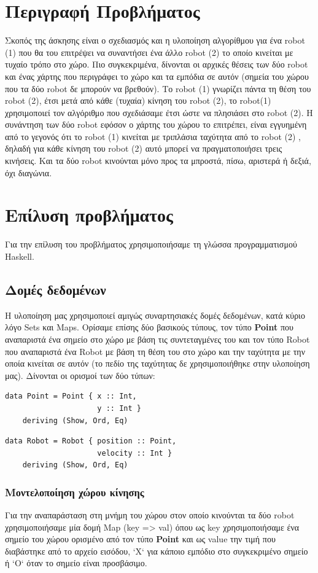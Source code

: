 \documentclass[12pt]{article}
\begin{document}
\tableofcontents

\pagebreak

\section{Περιγραφή Προβλήματος}
Σκοπός της άσκησης είναι ο σχεδιασμός και η υλοποίηση αλγορίθμου για ένα robot (1) που θα του επιτρέψει να συναντήσει ένα άλλο robot (2) το οποίο κινείται με τυχαίο τρόπο στο χώρο. Πιο συγκεκριμένα, δίνονται οι αρχικές θέσεις των δύο robot και ένας χάρτης που περιγράφει το χώρο και τα εμπόδια σε αυτόν (σημεία του χώρου που τα δύο robot δε μπορούν να βρεθούν). Το robot (1) γνωρίζει πάντα τη θέση του robot (2), έτσι μετά από κάθε (τυχαία) κίνηση του robot (2), το robot(1) χρησιμοποιεί τον αλγόριθμο που σχεδιάσαμε έτσι ώστε να πλησιάσει στο robot (2). Η συνάντηση των δύο robot εφόσον ο χάρτης του χώρου το επιτρέπει, είναι εγγυημένη από το γεγονός ότι το robot (1) κινείται με τριπλάσια ταχύτητα από το robot (2) , δηλαδή για κάθε κίνηση του robot (2) αυτό μπορεί να πραγματοποιήσει τρεις κινήσεις. Και τα δύο robot κινούνται μόνο προς τα μπροστά, πίσω, αριστερά ή δεξιά, όχι διαγώνια.
\section{Επίλυση προβλήματος}
Για την επίλυση του προβλήματος χρησιμοποιήσαμε τη γλώσσα προγραμματισμού Haskell.
\subsection{Δομές δεδομένων}
Η υλοποίηση μας χρησιμοποιεί αμιγώς συναρτησιακές δομές δεδομένων, κατά κύριο λόγο Sets και Maps. Ορίσαμε επίσης δύο βασικούς τύπους, τον τύπο \textbf{Point} που αναπαριστά ένα σημείο στο χώρο με βάση τις συντεταγμένες του και τον τύπο Robot που αναπαριστά ένα Robot με βάση τη θέση του στο χώρο και την ταχύτητα με την οποία κινείται σε αυτόν (το πεδίο της ταχύτητας δε χρησιμοποιήθηκε στην υλοποίηση μας). Δίνονται οι ορισμοί των δύο τύπων:
\begin{verbatim}
data Point = Point { x :: Int,
                     y :: Int }
    deriving (Show, Ord, Eq)
\end{verbatim}

\begin{verbatim}
data Robot = Robot { position :: Point,
                     velocity :: Int }
    deriving (Show, Ord, Eq)
\end{verbatim}
\subsubsection{Μοντελοποίηση χώρου κίνησης}
Για την αναπαράσταση στη μνήμη του χώρου στον οποίο κινούνται τα δύο robot χρησιμοποιήσαμε μία δομή Map (key => val) όπου ως key χρησιμοποιήσαμε ένα σημείο του χώρου ορισμένο από τον τύπο \textbf{Point} και ως value την τιμή που διαβάστηκε από το αρχείο εισόδου, `Χ` για κάποιο εμπόδιο στο συγκεκριμένο σημείο ή `Ο` όταν το σημείο είναι προσβάσιμο. 
\end{document}
